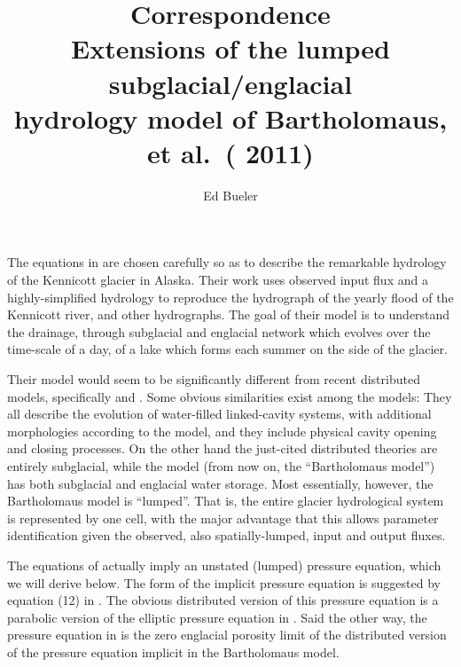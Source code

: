 \documentclass[twocolumn,letterpaper]{igs}
\begin{document}
\title{Correspondence \\ Extensions of the lumped subglacial/englacial \\ hydrology model of Bartholomaus, et al.~(
2011)}

\author{Ed Bueler}


\maketitle

The equations in \cite{Bartholomausetal2011} are chosen carefully so as to describe the remarkable hydrology of the Kennicott glacier in Alaska.  Their work uses observed input flux and a highly-simplified hydrology to reproduce the hydrograph of the yearly flood of the Kennicott river, and other hydrographs.  The goal of their model is to understand the drainage, through subglacial and englacial network which evolves over the time-scale of a day, of a lake which forms each summer on the side of the glacier.

Their model would seem to be significantly different from recent distributed models, specifically \cite{Schoofetal2012} and \cite{Hewittetal2012}.  Some obvious similarities exist among the models: They all describe the evolution of water-filled linked-cavity systems, with additional morphologies according to the model, and they include physical cavity opening and closing processes.  On the other hand the just-cited distributed theories are entirely subglacial, while the \cite{Bartholomausetal2011} model (from now on, the ``Bartholomaus model'') has both subglacial and englacial water storage.  Most essentially, however, the Bartholomaus model is ``lumped''.  That is, the entire glacier hydrological system is represented by one cell, with the major advantage that this allows parameter identification given the observed, also spatially-lumped, input and output fluxes.

The equations of \cite{Bartholomausetal2011} actually imply an unstated (lumped) pressure equation, which we will derive below.  The form of the implicit pressure equation is suggested by equation (12) in \cite{Bartholomausetal2011}.  The obvious distributed version of this pressure equation is a parabolic version of the elliptic pressure equation in \cite{Schoofetal2012}.  Said the other way, the pressure equation in \cite{Schoofetal2012} is the zero englacial porosity limit of the distributed version of the pressure equation implicit in the Bartholomaus model.
\end{document}

